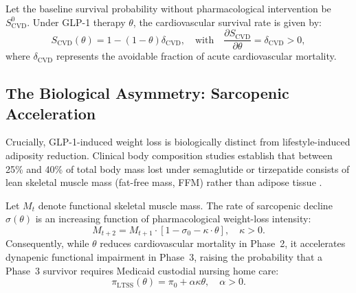 \documentclass[11pt,a4paper]{article}
\begin{document}
Let the baseline survival probability without pharmacological intervention be $S_{\text{CVD}}^0$. Under GLP-1 therapy $\theta$, the cardiovascular survival rate is given by:
\begin{equation}
    S_{\text{CVD}}(\theta) = 1 - (1 - \theta)\delta_{\text{CVD}}, \quad \text{with} \quad \frac{\partial S_{\text{CVD}}}{\partial \theta} = \delta_{\text{CVD}} > 0,
\end{equation}
where $\delta_{\text{CVD}}$ represents the avoidable fraction of acute cardiovascular mortality.

\subsection{The Biological Asymmetry: Sarcopenic Acceleration}
Crucially, GLP-1-induced weight loss is biologically distinct from lifestyle-induced adiposity reduction. Clinical body composition studies establish that between 25\% and 40\% of total body mass lost under semaglutide or tirzepatide consists of lean skeletal muscle mass (fat-free mass, FFM) rather than adipose tissue \citep{sargeant2024body}. 

Let $M_t$ denote functional skeletal muscle mass. The rate of sarcopenic decline $\sigma(\theta)$ is an increasing function of pharmacological weight-loss intensity:
\begin{equation}
    M_{t+2} = M_{t+1} \cdot \left[ 1 - \sigma_0 - \kappa \cdot \theta \right], \quad \kappa > 0.
\end{equation}
Consequently, while $\theta$ reduces cardiovascular mortality in Phase~2, it accelerates dynapenic functional impairment in Phase~3, raising the probability that a Phase~3 survivor requires Medicaid custodial nursing home care:
\begin{equation}
    \pi_{\text{LTSS}}(\theta) = \pi_0 + \alpha \kappa \theta, \quad \alpha > 0.
\end{equation}
\end{document}
